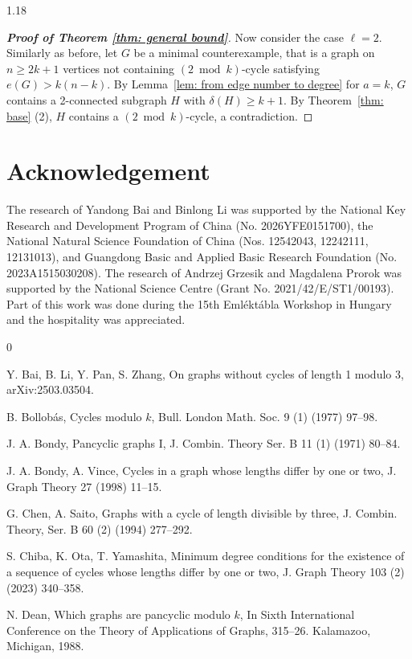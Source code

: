 \documentclass[10pt]{article}
\let\geq\geqslant
\begin{document}
\begin{spacing}{1.18}
\begin{proof}[\bf Proof of Theorem \ref{thm: general bound}]
    Now consider the case $\ell=2$. Similarly as before, let $G$ be a minimal counterexample, that is a graph on $n \geq 2k+1$ vertices not containing $(2 \bmod k)$-cycle satisfying $e(G) > k(n-k)$. By Lemma~\ref{lem: from edge number to degree} for $a=k$, $G$ contains a 2-connected subgraph $H$ with $\delta(H) \geq k+1$.
    By Theorem~\ref{thm: base} (2), $H$ contains a $(2 \bmod k)$-cycle, a contradiction.
\end{proof}



\section*{Acknowledgement}

The research of Yandong Bai and Binlong Li was supported by the National Key Research and Development Program of China (No. 2026YFE0151700), the National Natural Science Foundation of China (Nos. 12542043, 12242111, 12131013), and Guangdong Basic and Applied Basic Research Foundation (No. 2023A1515030208).  
The research of Andrzej Grzesik and Magdalena Prorok was supported by the National Science Centre (Grant No. 2021/42/E/ST1/00193). 
Part of this work was done during the 15th Emléktábla Workshop in Hungary and the hospitality was appreciated.

\begin{thebibliography}{0}

Y. Bai, B. Li, Y. Pan, S. Zhang,
On graphs without cycles of length 1 modulo 3,
arXiv:2503.03504.

B. Bollob\'{a}s, 
Cycles modulo $k$, 
Bull. London Math. Soc. 9 (1) (1977) 97--98.

J. A. Bondy, 
Pancyclic graphs I, 
J. Combin. Theory Ser. B 11 (1) (1971) 80--84.

J. A. Bondy, A. Vince, 
Cycles in a graph whose lengths differ by one or two, 
J. Graph Theory 27 (1998) 11--15.

G. Chen, A. Saito,
Graphs with a cycle of length divisible by three,
J. Combin. Theory, Ser. B 60 (2) (1994) 277--292.

S. Chiba, K. Ota, T. Yamashita,
Minimum degree conditions for the existence of a sequence of cycles whose lengths differ by
one or two, J. Graph Theory 103 (2) (2023) 340--358.

N. Dean, 
Which graphs are pancyclic modulo $k$,
In Sixth International Conference on the Theory of Applications of Graphs, 315–26. Kalamazoo, Michigan, 1988.



\end{thebibliography}
\end{spacing}
\end{document}
